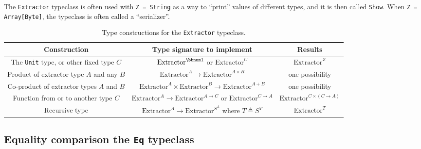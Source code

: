 The \lstinline!Extractor! typeclass is often used with \lstinline!Z = String!
as a way to ``print'' values of different types, and it is then
called \lstinline!Show!. When
\lstinline!Z = Array[Byte]!, the typeclass is often called a ``serializer''.

\begin{table}
\begin{centering}
\begin{tabular}{|c|c|c|}
\hline 
\textbf{\footnotesize{}Construction} & \textbf{\footnotesize{}Type signature to implement} & \textbf{\footnotesize{}Results}\tabularnewline
\hline 
\hline 
{\footnotesize{}The }\lstinline!Unit!{\footnotesize{} type, or other
fixed type $C$} & {\footnotesize{}$\text{Extractor}^{\bbnum 1}$ or $\text{Extractor}^{C}$} & {\footnotesize{}$\text{Extractor}^{Z}$}\tabularnewline
\hline 
{\footnotesize{}Product of extractor type $A$ and any $B$} & {\footnotesize{}$\text{Extractor}^{A}\rightarrow\text{Extractor}^{A\times B}$} & {\footnotesize{}one possibility}\tabularnewline
\hline 
{\footnotesize{}Co-product of extractor types $A$ and $B$} & {\footnotesize{}$\text{Extractor}^{A}\times\text{Extractor}^{B}\rightarrow\text{Extractor}^{A+B}$} & {\footnotesize{}one possibility}\tabularnewline
\hline 
{\footnotesize{}Function from or to another type $C$} & {\footnotesize{}$\text{Extractor}^{A}\rightarrow\text{Extractor}^{A\rightarrow C}$
or $\text{Extractor}^{C\rightarrow A}$} & {\footnotesize{}$\text{Extractor}^{C\times\left(C\rightarrow A\right)}$}\tabularnewline
\hline 
{\footnotesize{}Recursive type} & {\footnotesize{}$\text{Extractor}^{A}\rightarrow\text{Extractor}^{S^{A}}$
where $T\triangleq S^{T}$} & {\footnotesize{}$\text{Extractor}^{T}$}\tabularnewline
\hline 
\end{tabular}
\par\end{centering}
\caption{Type constructions for the \lstinline!Extractor! typeclass.\label{tab:Type-constructions-for-Extractor}}
\end{table}


\subsection{Equality comparison \textemdash{} the \texttt{Eq} typeclass\label{subsec:The-Eq-typeclass}}

